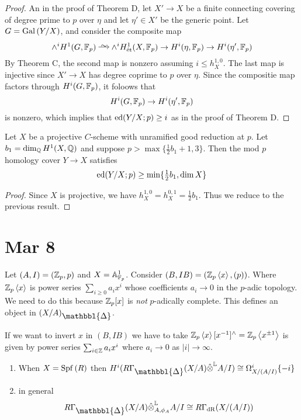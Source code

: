 \documentclass[12pt]{article}
\newcommand{\Prism}{{\mathlarger{\mathbbl{\Delta}}}}
\begin{document}
\begin{proof}
An in the proof of Theorem D, let $X' \to X$ be a finite connecting covering of degree prime to $p$ over $\eta$ and let $\eta' \in X'$ be the generic point. Let $G = \mathrm{Gal}\left( Y/X \right)$, and consider the composite map
\[ \wedge^i H^1(G, \FF_p) \iso \wedge^i H^1_{\et}(X, \FF_p) \to H^i(\eta, \FF_p) \to H^i(\eta', \FF_p) \]
By Theorem C, the second map is nonzero assuming $i \le h^{1,0}_X$. The last map is injective since $X' \to X$ has degree coprime to $p$ over $\eta$. Since the compositie map factors through $H^i(G, \mathbb{F}_p)$, it foloows that
\[ H^i(G, \mathbb{F}_p) \to H^i(\eta', \mathbb{F}_p) \]
is nonzero, which implies that $\mathrm{ed}(Y/X ; p) \ge i$ as in the proof of Theorem D. 
\end{proof}

\begin{cor}
Let $X$ be a projective $C$-scheme with unramified good reduction at $p$. Let $b_1 = \dim_{\mathbb{Q}} H^1(X, \mathbb{Q})$ and suppose $p > \max\{ \tfrac{1}{2} b_1 + 1, 3 \}$. Then the mod $p$ homology cover $Y \to X$ satisfies
\[ \mathrm{ed}(Y/X ; p) \ge \min \{ \tfrac{1}{2} b_1, \dim{X} \} \]
\end{cor}

\begin{proof}
Since $X$ is projective, we have $h^{1,0}_X = h^{0,1}_X = \tfrac{1}{2} b_1$. Thus we reduce to the previous result.
\end{proof}

\section{Mar 8}

\begin{example}
Let $(A, I) = (\mathbb{Z}_p, p)$ and $X = \mathbb{A}^1_{\mathbb{F}_p}$. Consider $(B, IB) = (\mathbb{Z}_p \left< x \right>, (p))$. Where $\mathbb{Z}_p \left< x \right>$ is power series $\sum_{i \ge 0} a_i x^i$ whose coefficients $a_i \to 0$ in the $p$-adic topology. We need to do this because $\mathbb{Z}_p[x]$ is \textit{not} $p$-adically complete. This defines an object in $(X/A)_{\Prism}$.
\end{example}

If we want to invert $x$ in $(B, IB)$ we have to take $\mathbb{Z}_p \left< x \right>[x^{-1}]^{\wedge} = \mathbb{Z}_p\left< x^{\pm 1} \right>$ is given by power series $\sum_{i \in \mathbb{Z}} a_i x^i$ where $a_i \to 0$ as $|i| \to \infty$.

\begin{theorem}
\begin{enumerate}
\item When $X  = \mathrm{Spf}\left( R \right)$ then $H^i(R\Gamma_{\Prism}(X/A) \hat{\ot}^{\LL} A / I) \cong \Omega_{X/(A/I)}^i \{ -i \}$
\item in general
\[ R \Gamma_{\Prism}(X/A) \hat{\ot}^{\LL}_{A, \phi_A} A /I \cong R \Gamma_{\dR}(X/(A/I)) \]
\end{enumerate}
\end{theorem}
\end{document}
